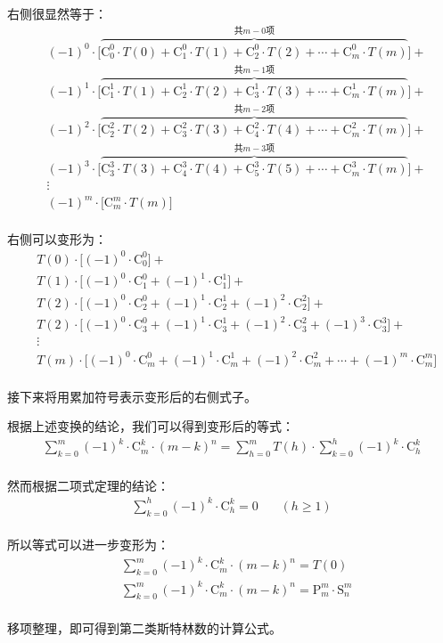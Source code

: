 \documentclass[UTF8]{ctexart}
\begin{document}
    右侧很显然等于：
    \begin{align}
        &(-1)^0\cdot\Big[\overbrace{\mathrm{C}_0^0\cdot T(0)+\mathrm{C}_1^0\cdot T(1)+\mathrm{C}_2^0\cdot T(2)+\cdots+\mathrm{C}_m^0\cdot T(m)}^{\text{共}m-0\text{项}}\Big]+\\[3mm]
        &(-1)^1\cdot\Big[\overbrace{\mathrm{C}_1^1\cdot T(1)+\mathrm{C}_2^1\cdot T(2)+\mathrm{C}_3^1\cdot T(3)+\cdots+\mathrm{C}_m^1\cdot T(m)}^{\text{共}m-1\text{项}}\Big]+\\[3mm]
        &(-1)^2\cdot\Big[\overbrace{\mathrm{C}_2^2\cdot T(2)+\mathrm{C}_3^2\cdot T(3)+\mathrm{C}_4^2\cdot T(4)+\cdots+\mathrm{C}_m^2\cdot T(m)}^{\text{共}m-2\text{项}}\Big]+\\[3mm]
        &(-1)^3\cdot\Big[\overbrace{\mathrm{C}_3^3\cdot T(3)+\mathrm{C}_4^3\cdot T(4)+\mathrm{C}_5^3\cdot T(5)+\cdots+\mathrm{C}_m^3\cdot T(m)}^{\text{共}m-3\text{项}}\Big]+\\[3mm]
        &\vdots\\[3mm]
        &(-1)^m\cdot\Big[\mathrm{C}_m^m\cdot T(m)\Big]
    \end{align}\\
    右侧可以变形为：
    \begin{align}
        &T(0)\cdot\Big[(-1)^0\cdot \mathrm{C}_0^0\Big]+\\[3mm]
        &T(1)\cdot\Big[(-1)^0\cdot \mathrm{C}_1^0+(-1)^1\cdot \mathrm{C}_1^1\Big]+\\[3mm]
        &T(2)\cdot\Big[(-1)^0\cdot \mathrm{C}_2^0+(-1)^1\cdot \mathrm{C}_2^1+(-1)^2\cdot \mathrm{C}_2^2\Big]+\\[3mm]
        &T(2)\cdot\Big[(-1)^0\cdot \mathrm{C}_3^0+(-1)^1\cdot \mathrm{C}_3^1+(-1)^2\cdot \mathrm{C}_3^2+(-1)^3\cdot \mathrm{C}_3^3\Big]+\\[3mm]
        &\vdots\\[3mm]
         &T(m)\cdot\Big[(-1)^0\cdot \mathrm{C}_m^0+(-1)^1\cdot \mathrm{C}_m^1+(-1)^2\cdot \mathrm{C}_m^2+\cdots+(-1)^m\cdot \mathrm{C}_m^m\Big]
    \end{align}\\
    接下来将用累加符号表示变形后的右侧式子。

\newpage

    根据上述变换的结论，我们可以得到变形后的等式：
    \begin{align}
        \sum_{k=0}^m(-1)^k\cdot\mathrm{C}_m^k\cdot(m-k)^n=\sum_{h=0}^mT(h)\cdot\sum_{k=0}^h(-1)^k\cdot\mathrm{C}_h^k
    \end{align}\\
    然而根据二项式定理的结论：
    \begin{align}
        \sum_{k=0}^h(-1)^k\cdot\mathrm{C}_h^k=0~~~~~~~~(h\geq 1)
    \end{align}\\
    所以等式可以进一步变形为：
    \begin{align}
        &\sum_{k=0}^m(-1)^k\cdot\mathrm{C}_m^k\cdot(m-k)^n=T(0)\\[3mm]
        &\sum_{k=0}^m(-1)^k\cdot\mathrm{C}_m^k\cdot(m-k)^n=\mathrm{P}_m^m\cdot\mathrm{S}_n^m
    \end{align}\\
    移项整理，即可得到第二类斯特林数的计算公式。\\
\end{document}
